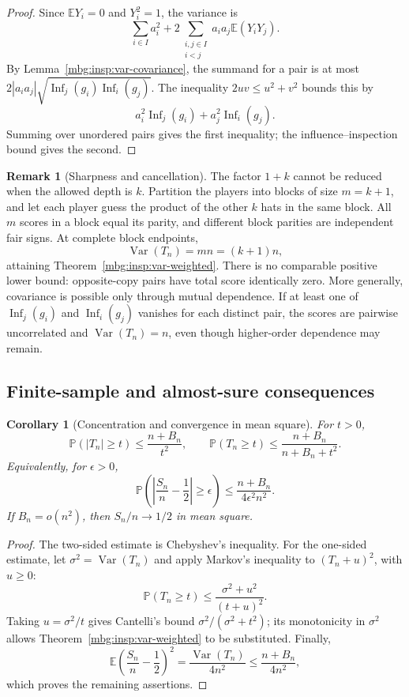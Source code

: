 \documentclass[11pt,letterpaper]{article}
\newtheorem{corollary}[theorem]{Corollary}
\theoremstyle{definition}
\newtheorem{remark}[theorem]{Remark}
\newcommand{\E}{\mathbb E}
\newcommand{\Prb}{\mathbb P}
\DeclareMathOperator{\Var}{Var}
\DeclareMathOperator{\Inf}{Inf}
\begin{document}
\begin{proof}
Since $\E Y_i=0$ and $Y_i^2=1$, the variance is
\[
 \sum_{i\in I}a_i^2+
 2\sum_{\substack{i,j\in I\\i<j}}a_ia_j\E(Y_iY_j).
\]
By Lemma~\ref{mbg:insp:var-covariance}, the summand for a pair is at most
$2|a_ia_j|\sqrt{\Inf_j(g_i)\Inf_i(g_j)}$.
The inequality $2uv\le u^2+v^2$ bounds this by
\[
 a_i^2\Inf_j(g_i)+a_j^2\Inf_i(g_j).
\]
Summing over unordered pairs gives the first inequality; the
influence--inspection bound gives the second.
\end{proof}

\begin{remark}[Sharpness and cancellation]
\label{mbg:insp:var-sharpness}
The factor $1+k$ cannot be reduced when the allowed depth is $k$.
Partition the players into blocks of size $m=k+1$, and let each player
guess the product of the other $k$ hats in the same block.  All $m$
scores in a block equal its parity, and different block parities are
independent fair signs.  At complete block endpoints,
\[
 \Var(T_n)=mn=(k+1)n,
\]
attaining Theorem~\ref{mbg:insp:var-weighted}.  There is no comparable positive
lower bound: opposite-copy pairs have total score identically zero.
More generally, covariance is possible only through mutual
dependence.  If at least one of $\Inf_j(g_i)$ and $\Inf_i(g_j)$
vanishes for each distinct pair, the scores are pairwise uncorrelated
and $\Var(T_n)=n$, even though higher-order dependence may remain.
\end{remark}

\subsection{Finite-sample and almost-sure consequences}

\begin{corollary}[Concentration and convergence in mean square]
\label{mbg:insp:var-concentration}
For $t>0$,
\[
 \Prb(|T_n|\ge t)\le\frac{n+B_n}{t^2},
 \qquad
 \Prb(T_n\ge t)\le\frac{n+B_n}{n+B_n+t^2}.
\]
Equivalently, for $\epsilon>0$,
\[
 \Prb\left(\left|\frac{S_n}{n}-\frac12\right|\ge\epsilon\right)
 \le\frac{n+B_n}{4\epsilon^2n^2}.
\]
If $B_n=o(n^2)$, then $S_n/n\to1/2$ in mean square.
\end{corollary}

\begin{proof}
The two-sided estimate is Chebyshev's inequality.  For the one-sided
estimate, let $\sigma^2=\Var(T_n)$ and apply Markov's inequality to
$(T_n+u)^2$, with $u\ge0$:
\[
 \Prb(T_n\ge t)\le\frac{\sigma^2+u^2}{(t+u)^2}.
\]
Taking $u=\sigma^2/t$ gives Cantelli's bound
$\sigma^2/(\sigma^2+t^2)$; its monotonicity in $\sigma^2$ allows
Theorem~\ref{mbg:insp:var-weighted} to be substituted.  Finally,
\[
 \E\left(\frac{S_n}{n}-\frac12\right)^2
 =\frac{\Var(T_n)}{4n^2}\le\frac{n+B_n}{4n^2},
\]
which proves the remaining assertions.
\end{proof}
\end{document}
